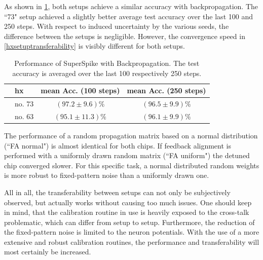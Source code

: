 As shown in \cref{backpropresults}, both setups achieve a similar accuracy with backpropagation. The ``73" setup achieved a slightly better average test accuracy over the last 100 and 250 steps. With respect to induced uncertainty by the various seeds, the difference between the setups is negligible. However, the convergence speed in \cref{hxsetuptransferability} is visibly different for both setups. 
\begin{table}[h!]\centering{}
	\begin{tabular}{@{}rlcc@{}}\toprule
		& \gls{hx}& mean Acc. (100 steps)	 & 	mean Acc. (250 steps) \\ \midrule
		& no. 73			& 	 $(97.2 \pm 9.6) \%$ & 	$(96.5 \pm 9.9) \%$\\
		& no. 63			&	$(95.1 \pm 11.3) \%$ & 	$(96.1 \pm 9.9) \%$\\
		\bottomrule
	\end{tabular}
	\caption[Performance of SuperSpike with Backpropagation.]{Performance of SuperSpike with Backpropagation. The test accuracy is averaged over the last 100 respectively 250 steps.}
	\label{backpropresults}
\end{table}

The performance of a random propagation matrix based on a normal distribution (``FA normal") is almost identical for both chips. If feedback alignment is performed with a uniformly drawn random matrix (``FA uniform") the detuned chip converged slower. For this specific task, a normal distributed random weights is more robust to fixed-pattern noise than a uniformly drawn one. 

All in all, the transferability between setups can not only be subjectively observed, but actually works without causing too much issues. One should keep in mind, that the calibration routine in use is heavily exposed to the cross-talk problematic, which can differ from setup to setup. Furthermore, the reduction of the fixed-pattern noise is limited to the neuron potentials. With the use of a more extensive and robust calibration routines, the performance and transferability will most certainly be increased. 

